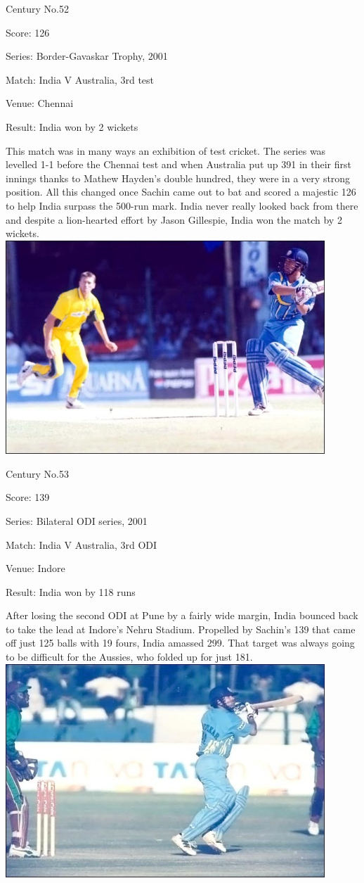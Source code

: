 \documentclass[11pt, a4paper]{article}
\begin{document}
Century No.52 

Score: 126 

Series: Border-Gavaskar Trophy, 2001 

Match: India V Australia, 3rd test 

Venue: Chennai 

Result: India won by 2 wickets 

This match was in many ways an exhibition of test cricket. The series was levelled 1-1 before the Chennai test and when Australia put up 391 in their first innings thanks to Mathew Hayden's double hundred, they were in a very strong position. All this changed once Sachin came out to bat and scored a majestic 126 to help India surpass the 500-run mark. India never really looked back from there and despite a lion-hearted effort by Jason Gillespie, India won the match by 2 wickets.
\newpage
\includegraphics[width=0.9\textwidth]{pics/53.jpg}

Century No.53 

Score: 139 

Series: Bilateral ODI series, 2001 

Match: India V Australia, 3rd ODI 

Venue: Indore 

Result: India won by 118 runs 

After losing the second ODI at Pune by a fairly wide margin, India bounced back to take the lead at Indore's Nehru Stadium. Propelled by Sachin's 139 that came off just 125 balls with 19 fours, India amassed 299. That target was always going to be difficult for the Aussies, who folded up for just 181.
\newpage
\includegraphics[width=0.9\textwidth]{pics/54.jpg}
\end{document}
